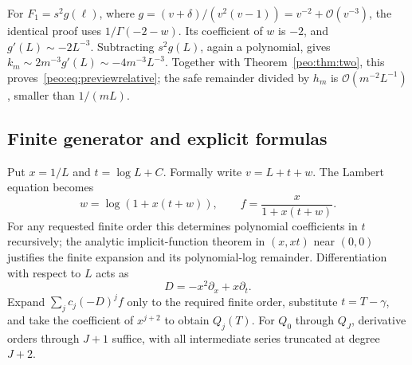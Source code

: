 \documentclass[11pt]{article}
\numberwithin{equation}{section}
\theoremstyle{remark}\newtheorem{remark}[theorem]{Remark}
\newcommand{\Oh}{\mathcal O}
\begin{document}
For $F_1=s^2g(\ell)$, where $g=(v+\delta)/(v^2(v-1))=v^{-2}+\Oh(v^{-3})$, the identical proof uses $1/\Gamma(-2-w)$. Its coefficient of $w$ is $-2$, and $g'(L)\sim-2L^{-3}$. Subtracting $s^2g(L)$, again a polynomial, gives
$k_m\sim2m^{-3}g'(L)\sim-4m^{-3}L^{-3}$.
Together with Theorem~\ref{peo:thm:two}, this proves~\eqref{peo:eq:previewrelative}; the safe remainder divided by $h_m$ is $\Oh(m^{-2}L^{-1})$, smaller than $1/(mL)$.

\subsection{Finite generator and explicit formulas}\label{peo:sec:generator}
Put $x=1/L$ and $t=\log L+C$. Formally write $v=L+t+w$. The Lambert equation becomes
\begin{equation}
 w=\log(1+x(t+w)),\qquad f=\frac{x}{1+x(t+w)}.
 \label{peo:eq:fgenerator}
\end{equation}
For any requested finite order this determines polynomial coefficients in $t$ recursively; the analytic implicit-function theorem in $(x,xt)$ near $(0,0)$ justifies the finite expansion and its polynomial-log remainder. Differentiation with respect to $L$ acts as
\begin{equation}
 D=-x^2\partial_x+x\partial_t.
\end{equation}
Expand $\sum_j c_j(-D)^jf$ only to the required finite order, substitute $t=T-\gamma$, and take the coefficient of $x^{j+2}$ to obtain $Q_j(T)$. For $Q_0$ through $Q_J$, derivative orders through $J+1$ suffice, with all intermediate series truncated at degree $J+2$.
\end{document}
